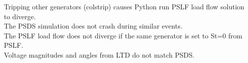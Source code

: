 \documentclass[12pt]{article}
\begin{document}
Tripping other generators (colstrip) causes Python run PSLF load flow solution to diverge. \\
The PSDS simulation does not crash during similar events.\\
The PSLF load flow does not diverge if the same generator is set to St=0 from PSLF.\\
Voltage magnitudes and angles from LTD do not match PSDS.
\end{document}
